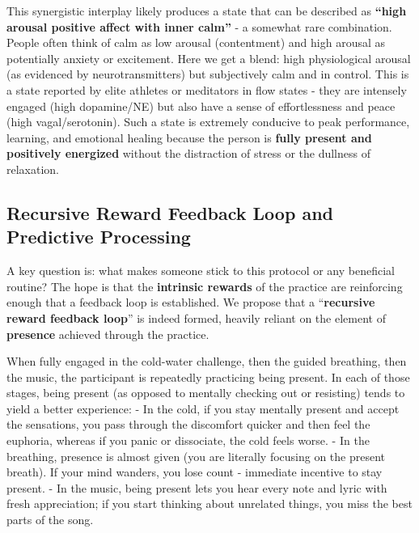 \documentclass[11pt]{article}
\newcommand{\quotes}[1]{``#1''}
\begin{document}
This synergistic interplay likely produces a state that can be described as \textbf{\quotes{high arousal positive affect with inner calm}} - a somewhat rare combination. People often think of calm as low arousal (contentment) and high arousal as potentially anxiety or excitement. Here we get a blend: high physiological arousal (as evidenced by neurotransmitters) but subjectively calm and in control. This is a state reported by elite athletes or meditators in flow states - they are intensely engaged (high dopamine/NE) but also have a sense of effortlessness and peace (high vagal/serotonin). Such a state is extremely conducive to peak performance, learning, and emotional healing because the person is \textbf{fully present and positively energized} without the distraction of stress or the dullness of relaxation.

\subsection{Recursive Reward Feedback Loop and Predictive Processing}

A key question is: what makes someone stick to this protocol or any beneficial routine? The hope is that the \textbf{intrinsic rewards} of the practice are reinforcing enough that a feedback loop is established. We propose that a \quotes{\textbf{recursive reward feedback loop}} is indeed formed, heavily reliant on the element of \textbf{presence} achieved through the practice.

When fully engaged in the cold-water challenge, then the guided breathing, then the music, the participant is repeatedly practicing being present. In each of those stages, being present (as opposed to mentally checking out or resisting) tends to yield a better experience:
- In the cold, if you stay mentally present and accept the sensations, you pass through the discomfort quicker and then feel the euphoria, whereas if you panic or dissociate, the cold feels worse.
- In the breathing, presence is almost given (you are literally focusing on the present breath). If your mind wanders, you lose count - immediate incentive to stay present.
- In the music, being present lets you hear every note and lyric with fresh appreciation; if you start thinking about unrelated things, you miss the best parts of the song.
\end{document}
